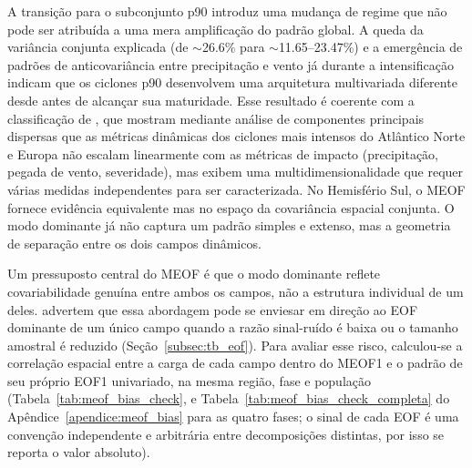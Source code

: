 A transição para o subconjunto p90 introduz uma mudança de regime que não pode ser atribuída a uma mera amplificação do padrão global.
A queda da variância conjunta explicada (de ${\sim}$26.6\% para ${\sim}$11.65--23.47\%) e a emergência de padrões de anticovariância entre precipitação e vento já durante a intensificação indicam que os ciclones p90 desenvolvem uma arquitetura multivariada diferente desde antes de alcançar sua maturidade.
Esse resultado é coerente com a classificação de \citet{corner2025classification}, que mostram mediante análise de componentes principais dispersas que as métricas dinâmicas dos ciclones mais intensos do Atlântico Norte e Europa não escalam linearmente com as métricas de impacto (precipitação, pegada de vento, severidade), mas exibem uma multidimensionalidade que requer várias medidas independentes para ser caracterizada.
No Hemisfério Sul, o MEOF fornece evidência equivalente mas no espaço da covariância espacial conjunta. O modo dominante já não captura um padrão simples e extenso, mas a geometria de separação entre os dois campos dinâmicos.

Um pressuposto central do MEOF é que o modo dominante reflete covariabilidade genuína entre ambos os campos, não a estrutura individual de um deles. \citet{bretherton1992intercomparison} advertem que essa abordagem pode se enviesar em direção ao EOF dominante de um único campo quando a razão sinal-ruído é baixa ou o tamanho amostral é reduzido (Seção~\ref{subsec:tb_eof}). Para avaliar esse risco, calculou-se a correlação espacial entre a carga de cada campo dentro do MEOF1 e o padrão de seu próprio EOF1 univariado, na mesma região, fase e população (Tabela~\ref{tab:meof_bias_check}, e Tabela~\ref{tab:meof_bias_check_completa} do Apêndice~\ref{apendice:meof_bias} para as quatro fases; o sinal de cada EOF é uma convenção independente e arbitrária entre decomposições distintas, por isso se reporta o valor absoluto).



